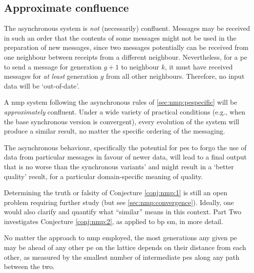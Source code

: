 \subsection{Approximate confluence}
The asynchronous system is \emph{not} (necessarily) confluent.  Messages may be received in such an order that the contents of some messages might not be used in the preparation of new messages, since two messages potentially can be received from one neighbour between receipts from a different neighbour.  Nevertheless, for a \gls{pe} to send a message for generation \(g + 1\) to neighbour \(k\), it must have received messages for \emph{at least} generation \(g\) from all other neighbours.  Therefore, no input data will be `out-of-date'.

\begin{conjecture}\label{conj:nmp:1}
A \gls{nmp} system following the asynchronous rules of \cref{sec:nmp:pespecific} will be \emph{approximately} confluent.  Under a wide variety of practical conditions (e.g., when the base synchronous version is convergent), every evolution of the system will produce a similar result, no matter the specific ordering of the messaging.
\end{conjecture}

\begin{conjecture}\label{conj:nmp:2}
    The asynchronous behaviour, specifically the potential for \glspl{pe} to forgo the use of data from particular messages in favour of newer data, will lead to a final output that is no worse than the synchronous variants' and might result in a `better quality' result, for a particular domain-specific meaning of quality.
\end{conjecture}

Determining the truth or falsity of Conjecture \ref{conj:nmp:1} is still an open problem requiring further study (but see \cref{sec:nmp:convergence}).  Ideally, one would also clarify and quantify what ``similar'' means in this context.  Part Two investigates Conjecture \ref{conj:nmp:2}, as applied to \gls{bp} \gls{sm}, in more detail.

\begin{proposition}\label{prop:nmp:3}
    No matter the approach to \gls{nmp} employed, the most generations any given \gls{pe} may be ahead of any other \gls{pe} on the lattice depends on their distance from each other, as measured by the smallest number of intermediate \glspl{pe} along any path between the two.
\end{proposition}

